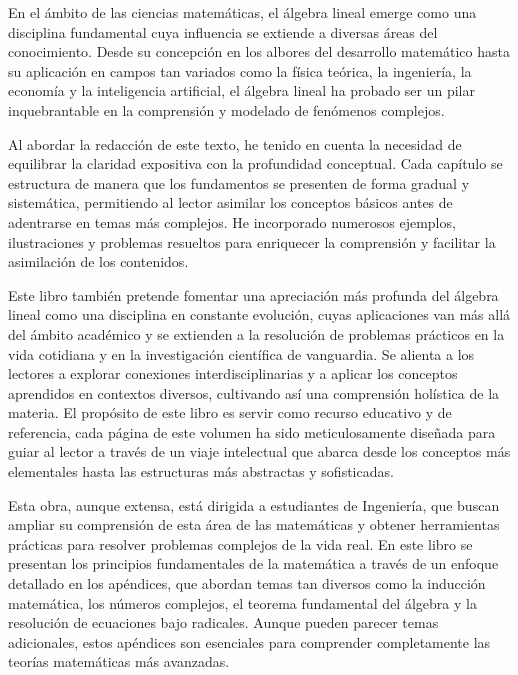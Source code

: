 \newpage

\vspace{3.75cm}

En el ámbito de las ciencias matemáticas, el álgebra lineal emerge como una disciplina fundamental cuya influencia se extiende a diversas áreas del conocimiento. Desde su concepción en los albores del desarrollo matemático hasta su aplicación en campos tan variados como la física teórica, la ingeniería, la economía y la inteligencia artificial, el álgebra lineal ha probado ser un pilar inquebrantable en la comprensión y modelado de fenómenos complejos.

Al abordar la redacción de este texto, he tenido en cuenta la necesidad de equilibrar la claridad expositiva con la profundidad conceptual. Cada capítulo se estructura de manera que los fundamentos se presenten de forma gradual y sistemática, permitiendo al lector asimilar los conceptos básicos antes de adentrarse en temas más complejos. He incorporado numerosos ejemplos, ilustraciones y problemas resueltos para enriquecer la comprensión y facilitar la asimilación de los contenidos.

Este libro también pretende fomentar una apreciación más profunda del álgebra lineal como una disciplina en constante evolución, cuyas aplicaciones van más allá del ámbito académico y se extienden a la resolución de problemas prácticos en la vida cotidiana y en la investigación científica de vanguardia. Se alienta a los lectores a explorar conexiones interdisciplinarias y a aplicar los conceptos aprendidos en contextos diversos, cultivando así una comprensión holística de la materia. El propósito de este libro es servir como recurso educativo y de referencia, cada página de este volumen ha sido meticulosamente diseñada para guiar al lector a través de un viaje intelectual que abarca desde los conceptos más elementales hasta las estructuras más abstractas y sofisticadas.

Esta obra, aunque extensa, está dirigida a estudiantes de Ingeniería, que buscan ampliar su comprensión de esta área de las matemáticas y obtener herramientas prácticas para resolver problemas complejos de la vida real. En este libro se presentan los principios fundamentales de la matemática a través de un enfoque detallado en los apéndices, que abordan temas tan diversos como la inducción matemática, los números complejos, el teorema fundamental del álgebra y la resolución de ecuaciones bajo radicales. Aunque pueden parecer temas adicionales, estos apéndices son esenciales para comprender completamente las teorías matemáticas más avanzadas.

